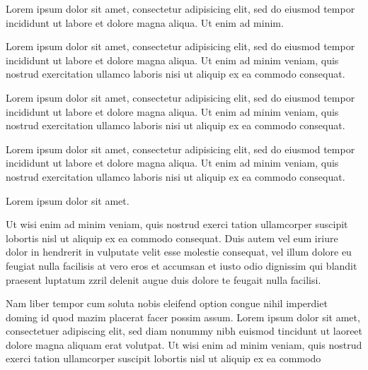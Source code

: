 \documentclass{article}
\begin{document}

Lorem ipsum dolor sit amet, consectetur adipisicing elit, sed do eiusmod
tempor incididunt ut labore et dolore magna aliqua. Ut enim ad minim.

\begin{clozepar}
Lorem ipsum dolor sit amet, consectetur adipisicing elit, sed do eiusmod
tempor incididunt ut labore et dolore magna aliqua. Ut enim ad minim
veniam, quis nostrud exercitation ullamco laboris nisi ut aliquip ex ea
commodo consequat.
\end{clozepar}



\begin{clozepar}
Lorem ipsum dolor sit amet, consectetur adipisicing elit, sed do eiusmod
tempor incididunt ut labore et dolore magna aliqua. Ut enim ad minim
veniam, quis nostrud exercitation ullamco laboris nisi ut aliquip ex ea
commodo consequat.
\end{clozepar}



\begin{clozepar}
Lorem ipsum dolor sit amet, consectetur adipisicing elit, sed do eiusmod
tempor incididunt ut labore et dolore magna aliqua. Ut enim ad minim
veniam, quis nostrud exercitation ullamco laboris nisi ut aliquip ex ea
commodo consequat.
\end{clozepar}

Lorem ipsum dolor sit amet.

\begin{clozepar}
Ut wisi enim ad minim veniam, quis nostrud exerci tation ullamcorper
suscipit lobortis nisl ut aliquip ex ea commodo consequat. Duis autem
vel eum iriure dolor in hendrerit in vulputate velit esse molestie
consequat, vel illum dolore eu feugiat nulla facilisis at vero eros et
accumsan et iusto odio dignissim qui blandit praesent luptatum zzril
delenit augue duis dolore te feugait nulla facilisi.

Nam liber tempor cum soluta nobis eleifend option congue nihil imperdiet
doming id quod mazim placerat facer possim assum. Lorem ipsum dolor sit
amet, consectetuer adipiscing elit, sed diam nonummy nibh euismod
tincidunt ut laoreet dolore magna aliquam erat volutpat. Ut wisi enim ad
minim veniam, quis nostrud exerci tation ullamcorper suscipit lobortis
nisl ut aliquip ex ea commodo
\end{clozepar}
\end{document}
